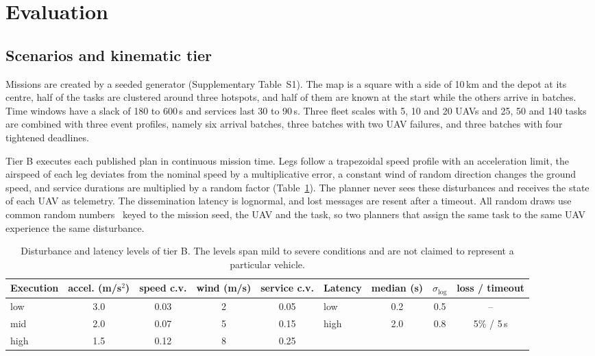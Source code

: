 \section{Evaluation}\label{sec:setup}
\subsection{Scenarios and kinematic tier}
Missions are created by a seeded generator (Supplementary Table~S1). The map is a square with a side of 10\,km and the
depot at its centre, half of the tasks are clustered around three hotspots, and half of them are known at the start
while the others arrive in batches. Time windows have a slack of 180 to 600\,s and services last 30 to 90\,s. Three
fleet scales with 5, 10 and 20 UAVs and 25, 50 and 140 tasks are combined with three event profiles, namely six arrival
batches, three batches with two UAV failures, and three batches with four tightened deadlines.

Tier B executes each published plan in continuous mission time. Legs follow a trapezoidal speed profile with an
acceleration limit, the airspeed of each leg deviates from the nominal speed by a multiplicative error, a constant wind
of random direction changes the ground speed, and service durations are multiplied by a random factor
(Table~\ref{tab:levels}). The planner never sees these disturbances and receives the state of each UAV as telemetry.
The dissemination latency is lognormal, and lost messages are resent after a timeout. All random draws use common random
numbers~\cite{law2015simulation} keyed to the mission seed, the UAV and the task, so two planners that assign the same
task to the same UAV experience the same disturbance.

\begin{table}[t]
\caption{Disturbance and latency levels of tier B. The levels span mild to severe conditions and are not claimed to
represent a particular vehicle.}\label{tab:levels}
\centering\small
\setlength{\tabcolsep}{4pt}
\begin{tabular}{lcccc@{\quad}lccc}
\toprule
Execution & accel. (m/s$^2$) & speed c.v. & wind (m/s) & service c.v. & Latency & median (s) & $\sigma_{\log}$ & loss / timeout \\
\midrule
low & 3.0 & 0.03 & 2 & 0.05 & low & 0.2 & 0.5 & -- \\
mid & 2.0 & 0.07 & 5 & 0.15 & high & 2.0 & 0.8 & 5\% / 5\,s \\
high & 1.5 & 0.12 & 8 & 0.25 & & & & \\
\bottomrule
\end{tabular}
\end{table}

